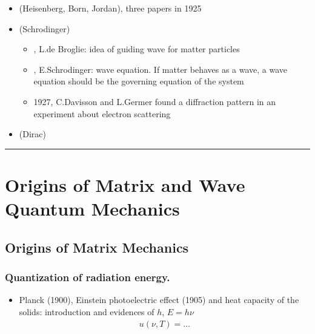 \documentclass[letterpaper,10pt,english]{jupyterBook}
\begin{document}
\sphinxAtStartPar
{}
\begin{itemize}
\item {} 
\sphinxAtStartPar
{} (Heisenberg, Born, Jordan), three papers in 1925

\item {} 
\sphinxAtStartPar
{} (Schrodinger)
\begin{itemize}
\item {} 
, L.\({}\)de Broglie: idea of guiding wave for matter particles

\item {} 
, E.Schrodinger: wave equation. If matter behaves as a wave, a wave equation should be the governing equation of the system

\item {} 
\sphinxhyphen{}1927, C.Davisson and L.Germer found a diffraction pattern in an experiment about electron scattering

\end{itemize}

\item {} 
\sphinxAtStartPar
{} (Dirac)

\end{itemize}


\bigskip\hrule\bigskip


\sphinxstepscope


\section{Origins of Matrix and Wave Quantum Mechanics}
\label{\detokenize{ch/quantum-mechanics/history/origins:origins-of-matrix-and-wave-quantum-mechanics}}\label{\detokenize{ch/quantum-mechanics/history/origins:quantum-mechanics-history-origins}}\label{\detokenize{ch/quantum-mechanics/history/origins::doc}}

\subsection{Origins of Matrix Mechanics}
\label{\detokenize{ch/quantum-mechanics/history/origins:origins-of-matrix-mechanics}}\label{\detokenize{ch/quantum-mechanics/history/origins:quantum-mechanics-history-origins-matrix-mechanics}}\subsubsection*{Quantization of radiation energy.}
\begin{itemize}
\item {} 
\sphinxAtStartPar
Planck (1900), Einstein photoelectric effect (1905) and heat capacity of the solids: introduction and evidences of \(h\), \(E = h \nu\)
\begin{equation}\label{equation:ch/quantum-mechanics/history/origins:eq:history:planck-radiation-formula}
\begin{split}u(\nu, T) = \dots\end{split}
\end{equation}
\end{itemize}
\end{document}
